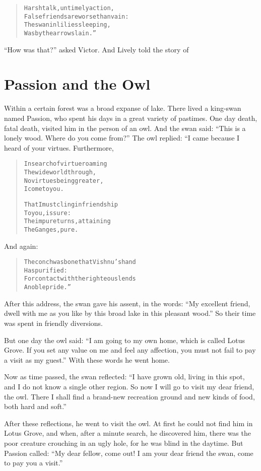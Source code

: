 \documentclass[article, twoside, 14pt]{memoir}
\renewenvironment{verbatim}{%
\begin{quote}%
\vskip -10pt%
\begin{alltt}\normalfont\large}{\end{alltt}%
\end{quote}%
\vskip -10pt
} %
\begin{document}
\begin{verbatim}
Harsh talk, untimely action,
    False friends{\textemdash}are worse than vain:
The swan in lilies sleeping,
    Was by the arrow slain.”
\end{verbatim}
``How was that?'' asked Victor. And Lively told the story of

\chapter{Passion and the Owl}

\label{s15}

Within a certain forest was a broad expanse of lake. There lived a
king-swan named Passion, who spent his days in a great variety of
pastimes. One day death, fatal death, visited him in the person of
an owl. And the swan said:
``This is a lonely wood. Where do you come from?'' The owl replied:
“I came because I heard of your virtues. Furthermore,

\begin{verbatim}
In search of virtue roaming
    The wide world through,
No virtues being greater,
    I come to you.

That I must cling in friendship
    To you, is sure:
The impure turns, attaining
    The Ganges, pure.
\end{verbatim}
And again:

\begin{verbatim}
The conch was bone that Vishnu's hand
    Has purified:
For contact with the righteous lends
    A noble pride.”
\end{verbatim}
After this address, the swan gave his assent, in the words:
``My excellent friend, dwell with me as you like by this broad lake in this pleasant wood.''
So their time was spent in friendly diversions.

But one day the owl said:
``I am going to my own home, which is called Lotus Grove. If you set any value on me and feel any affection, you must not fail to pay a visit as my guest.''
With these words he went home.

Now as time passed, the swan reflected:
``I have grown old, living in this spot, and I do not know a single other region. So now I will go to visit my dear friend, the owl. There I shall find a brand-new recreation ground and new kinds of food, both hard and soft.''

After these reflections, he went to visit the owl. At first he
could not find him in Lotus Grove, and when, after a minute search,
he discovered him, there was the poor creature crouching in an ugly
hole, for he was blind in the daytime. But Passion called:
``My dear fellow, come out! I am your dear friend the swan, come to pay you a visit.''
\end{document}
